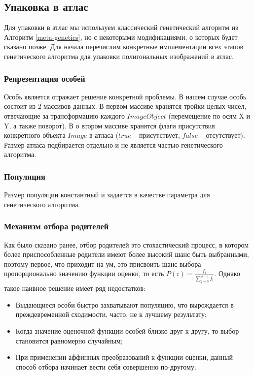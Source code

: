 \documentclass{fefu_thesis/cls/fefu}
\newcommand*\talgref[1]{Алгоритм \ref{#1}}
\begin{document}
    \subsection{Упаковка в атлас}
    Для упаковки в атлас мы используем классический генетический алгоритм из \talgref{meta-genetics}, но с некоторыми модификациями, о которых будет сказано позже. Для начала перечислим конкретные имплементации всех этапов генетического алгоритма для упаковки полигональных изображений в атлас.
    \subsubsection{Репрезентация особей}
    Особь является отражает решение конкретной проблемы. В нашем случае особь состоит из 2 массивов данных. В первом массиве хранятся тройки целых чисел, отвечающие за трансформацию каждого $ImageObject$ (перемещение по осям X и Y, а также поворот). В о втором массиве хранятся флаги присутствия конкретного объекта $Image$ в атласа ($true$ -- присутствует, $false$ -- отсутствует). Размер атласа подбирается отдельно и не является частью генетического алгоритма.
    \subsubsection{Популяция}
    Размер популяции константный и задается в качестве параметра для генетического алгоритма.
    \subsubsection{Механизм отбора родителей}
    Как было сказано ранее, отбор родителей это стохастический процесс, в котором более приспособленные родители имеют более высокий шанс быть выбранными, поэтому первое, что приходит на ум, это присвоить шанс выбора пропорционально значению функции оценки, то есть $P\left(i\right) = \frac{f_i}{\sum_{j=0}^{n - 1} f_i}$. Однако такое наивное решение имеет ряд недостатков:
    \begin{itemize}
        \item Выдающиеся особи быстро захватывают популяцию, что вырождается в преждевременной сходимости, часто, не к лучшему результату;
        \item Когда значение оценочной функции особей близко друг к другу, то выбор становится равномерно случайным;
        \item При применении аффинных преобразований к функции оценки, данный способ отбора начинает вести себя совершенно по-другому.
    \end{itemize}
\end{document}
